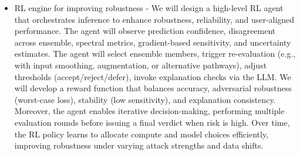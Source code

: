 \documentclass[a4paper,11pt]{article}
\begin{document}
\begin{itemize}
	\item RL engine for improving robustness - We will design a high-level RL agent that orchestrates inference to enhance robustness, reliability, and user-aligned performance. The agent will observe prediction confidence, disagreement across ensemble, spectral metrics, gradient-based sensitivity, and uncertainty estimates. The agent will select ensemble members, trigger re-evaluation (e.g., with input smoothing, augmentation, or alternative pathways), adjust thresholds (accept/reject/defer), invoke explanation checks via the LLM. We will develop a reward function that balances accuracy, adversarial robustness (worst-case loss), stability (low sensitivity), and explanation consistency. Moreover, the agent enables iterative decision-making, performing multiple evaluation rounds before issuing a final verdict when risk is high.  Over time, the RL policy learns to allocate compute and model choices efficiently, improving robustness under varying attack strengths and data shifts.
	
\end{itemize}
\end{document}
